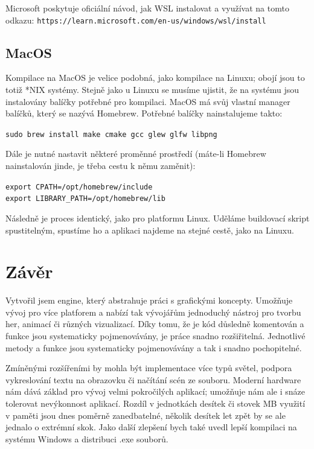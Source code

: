\documentclass[12pt]{article}
\begin{document}
Microsoft poskytuje oficiální návod, jak WSL instalovat a využívat na tomto odkazu:
\texttt{https://learn.microsoft.com/en-us/windows/wsl/install}

\subsection{MacOS}

Kompilace na MacOS je velice podobná, jako kompilace na Linuxu; obojí jsou to totiž *NIX systémy. Stejně jako u Linuxu se musíme ujistit, že na systému jsou instalovány balíčky potřebné pro kompilaci. MacOS má svůj vlastní manager balíčků, který se nazývá Homebrew. Potřebné balíčky nainstalujeme takto:

\noindent\texttt{sudo brew install make cmake gcc glew glfw libpng}

Dále je nutné nastavit některé proměnné prostředí (máte-li Homebrew nainstalován jinde, je třeba cestu k němu zaměnit):

\noindent\texttt{export CPATH=/opt/homebrew/include}\\
\noindent\texttt{export LIBRARY_PATH=/opt/homebrew/lib}

Následně je proces identický, jako pro platformu Linux. Uděláme buildovací skript spustitelným, spustíme ho a aplikaci najdeme na stejné cestě, jako na Linuxu.

\pagebreak

\section{Závěr}

Vytvořil jsem engine, který abstrahuje práci s grafickými koncepty. Umožňuje vývoj pro více platforem a nabízí tak vývojářům jednoduchý nástroj pro tvorbu her, animací či různých vizualizací. Díky tomu, že je kód důsledně komentován a funkce jsou systematicky pojmenovávány, je práce snadno rozšiřitelná. Jednotlivé metody a funkce jsou systematicky pojmenovávány a tak i snadno pochopitelné.

Zmíněnými rozšířeními by mohla být implementace více typů světel, podpora vykreslování textu na obrazovku či načítání scén ze souboru. Moderní hardware nám dává základ pro vývoj velmi pokročilých aplikací; umožňuje nám ale i snáze tolerovat nevýkonnost aplikací. Rozdíl v jednotkách desítek či stovek MB využití v paměti jsou dnes poměrně zanedbatelné, několik desítek let zpět by se ale jednalo o extrémní skok. Jako další zlepšení bych také uvedl lepší kompilaci na systému Windows a distribuci .exe souborů.
\end{document}
